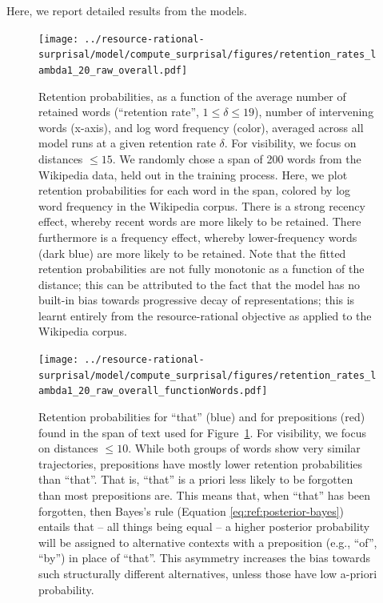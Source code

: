 

Here, we report detailed results from the models.


\begin{figure}
    \centering
        \texttt{[image: ../resource-rational-surprisal/model/compute\_surprisal/figures/retention\_rates\_lambda1\_20\_raw\_overall.pdf]}

    
	\caption{Retention probabilities, as a function of the average number of retained words (``retention rate'', $1 \leq \delta \leq 19$), number of intervening words (x-axis), and log word frequency (color), averaged across all model runs at a given retention rate $\delta$.
	For visibility, we focus on distances $\leq 15$.
	We randomly chose a span of 200 words from the Wikipedia data, held out in the training process. Here, we plot retention probabilities for each word in the span, colored by log word frequency in the Wikipedia corpus. There is a strong recency effect, whereby recent words are more likely to be retained. There furthermore is a frequency effect, whereby lower-frequency words (dark blue) are more likely to be retained.
	Note that the fitted retention probabilities are not fully monotonic as a function of the distance; this can be attributed to the fact that the model has no built-in bias towards progressive decay of representations; this is learnt entirely from the resource-rational objective as applied to the Wikipedia corpus.
	}
    \label{fig:retention-probs}
\end{figure}

\begin{figure}
    \centering
        \texttt{[image: ../resource-rational-surprisal/model/compute\_surprisal/figures/retention\_rates\_lambda1\_20\_raw\_overall\_functionWords.pdf]}

    
	\caption{Retention probabilities for ``that'' (blue) and for prepositions (red) found in the span of text used for Figure~\ref{fig:retention-probs}.
	For visibility, we focus on distances $\leq 10$.
While both groups of words show very similar trajectories, prepositions have mostly lower retention probabilities than ``that''.
That is, ``that'' is a priori less likely to be forgotten than most prepositions are.
	This means that, when ``that'' has been forgotten, then Bayes's rule (Equation \ref{eq:ref:posterior-bayes}) entails that -- all things being equal -- a higher posterior probability will be assigned to alternative contexts with a preposition (e.g., ``of'', ``by'') in place of ``that''.
	This asymmetry increases the bias towards such structurally different alternatives, unless those have low a-priori probability.
	}
    \label{fig:retention-probs-that}
\end{figure}






